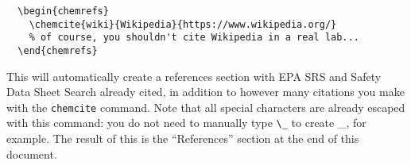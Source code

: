 \documentclass{lab_report}
\begin{document}
\begin{verbatim}
  \begin{chemrefs}
    \chemcite{wiki}{Wikipedia}{https://www.wikipedia.org/}
    % of course, you shouldn't cite Wikipedia in a real lab...
  \end{chemrefs}
\end{verbatim}

This will automatically create a references section with EPA SRS and Safety Data Sheet Search already cited, in addition to however many citations you make with the \verb|chemcite| command. Note that all special characters are already escaped with this command: you do not need to manually type \verb|\_| to create \_, for example. The result of this is the ``References'' section at the end of this document.

\begin{chemrefs}
\end{chemrefs}
\end{document}
